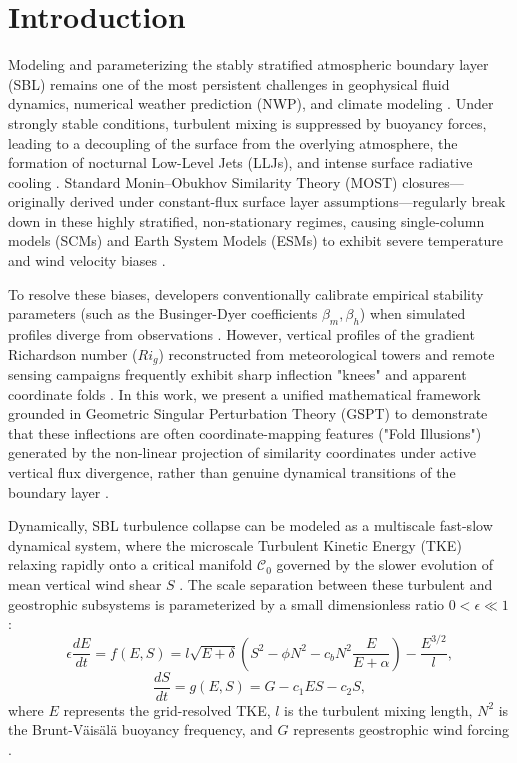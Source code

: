 \documentclass[draft,11pt,twocolumn]{article}
\theoremstyle{definition}
\theoremstyle{remark}
\begin{document}
\section{Introduction}
Modeling and parameterizing the stably stratified atmospheric boundary layer (SBL) remains one of the most persistent challenges in geophysical fluid dynamics, numerical weather prediction (NWP), and climate modeling \cite{gabls3_2013, sheba2002}. Under strongly stable conditions, turbulent mixing is suppressed by buoyancy forces, leading to a decoupling of the surface from the overlying atmosphere, the formation of nocturnal Low-Level Jets (LLJs), and intense surface radiative cooling \cite{cases99, grachev2007}. Standard Monin--Obukhov Similarity Theory (MOST) closures—originally derived under constant-flux surface layer assumptions—regularly break down in these highly stratified, non-stationary regimes, causing single-column models (SCMs) and Earth System Models (ESMs) to exhibit severe temperature and wind velocity biases \cite{cases99, gabls3_2013, businger1971}.

To resolve these biases, developers conventionally calibrate empirical stability parameters (such as the Businger-Dyer coefficients $\beta_m, \beta_h$) when simulated profiles diverge from observations \cite{gabls3_2013, businger1971, STABILITY}. However, vertical profiles of the gradient Richardson number ($Ri_g$) reconstructed from meteorological towers and remote sensing campaigns frequently exhibit sharp inflection "knees" and apparent coordinate folds \cite{cases99, BelowFastSlow}. In this work, we present a unified mathematical framework grounded in Geometric Singular Perturbation Theory (GSPT) to demonstrate that these inflections are often coordinate-mapping features ("Fold Illusions") generated by the non-linear projection of similarity coordinates under active vertical flux divergence, rather than genuine dynamical transitions of the boundary layer \cite{fenichel1979, CleanRestatement}.

Dynamically, SBL turbulence collapse can be modeled as a multiscale fast-slow dynamical system, where the microscale Turbulent Kinetic Energy (TKE) relaxing rapidly onto a critical manifold $\mathcal{C}_0$ governed by the slower evolution of mean vertical wind shear $S$ \cite{BelowFastSlow, CleanRestatement}. The scale separation between these turbulent and geostrophic subsystems is parameterized by a small dimensionless ratio $0 < \epsilon \ll 1$ \cite{BelowFastSlow}:
\begin{equation}
    \epsilon \frac{dE}{dt} = f(E, S) = l \sqrt{E+\delta} \left( S^2 - \phi N^2 - c_b N^2 \frac{E}{E+\alpha} \right) - \frac{E^{3/2}}{l}, \label{eq:fast_tke_intro}
\end{equation}
\begin{equation}
    \frac{dS}{dt} = g(E, S) = G - c_1 E S - c_2 S, \label{eq:slow_shear_intro}
\end{equation}
where $E$ represents the grid-resolved TKE, $l$ is the turbulent mixing length, $N^2$ is the Brunt-V\"ais\"al\"a buoyancy frequency, and $G$ represents geostrophic wind forcing \cite{BelowFastSlow, CoreMathRevisions}. 
\end{document}
